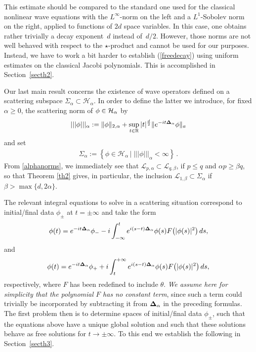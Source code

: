 This estimate should be compared to the standard one used for the
classical nonlinear wave equations with the $L^\infty$-norm on the
left and a $L^1$-Sobolev norm on the right, applied to
functions of $2d$ space variables. In this case, one obtains rather
trivially a decay exponent~$d$ instead of~$d/2$. However, those norms
are not well behaved with respect to the $\star$-product and cannot be
used for our purposes. Instead, we have to work a bit harder to establish
(\ref{freedecay}) using uniform estimates on the classical Jacobi
polynomials. This is accomplished in Section~\ref{secth2}.



Our last main result concerns the existence of wave operators
def\/ined on a scattering subspace $\Sigma_\alpha\subset \mathcal H_\alpha$. In order to def\/ine
the latter we introduce, for f\/ixed $\alpha\geq 0$, the scattering norm
of $\phi\in{\cal H}_\alpha$ by
\begin{gather*}%
|||\phi|||_{\alpha}:=
\Vert\phi\Vert_{2,\alpha}+\sup_{t\in\mathbb R} |t|^{\frac d2}
\Vert e^{-it{\bf\Delta}_\alpha}\phi\Vert_a
\end{gather*}
and set
\begin{gather*}
\Sigma_{\alpha}:=\left\{\phi\in\mathcal H_\alpha\,|\;|||\phi|||_{\alpha}<\infty\right\}\,.
\end{gather*}
From \eqref{alphanorms}, we immediately see that
$\mathcal L_{p,\alpha}\subset\mathcal L_{q,\beta}$, if $p\leq q$ and
$\alpha p\geq\beta q$, so that Theorem \ref{th2} gives, in particular, the
inclusion $\mathcal L_{1,\beta}\subset\Sigma_\alpha$ if $\beta> \max\{d, 2\alpha\}$.

The relevant integral equations to solve in a scattering situation
correspond to initial/f\/inal data $\phi_\pm$ at $t=\pm\infty$ and
take the form
\begin{gather}
\label{NLSch4-}
\phi(t)=e^{-it{{\bf\Delta}_\alpha}}\phi_--i\int_{-\infty}^t
e^{i{(s-t){\bf\Delta}_\alpha}}\phi(s) F\big(|\phi(s)|^2\big)\,ds ,
\end{gather}
and
\begin{gather}
\label{NLSch4+}
\phi(t)=e^{-it{{\bf\Delta}_\alpha}}\phi_++i\int^{+\infty}_t
e^{i{(s-t){\bf\Delta}_\alpha}}\phi(s) F\big(|\phi(s)|^2\big)\,ds ,
\end{gather}
respectively, where $F$ has been redef\/ined to include $\theta$.
 {\it We assume here for simplicity that the polynomial $F$
has no constant term}, since such a term could trivially be incorporated by
subtracting it from ${\bf\Delta}_\alpha$ in the preceding formulas.   The
f\/irst problem
then is to determine spaces of initial/f\/inal data $\phi_\pm$, such that the
equations above have a unique global solution and such that these
solutions behave as free solutions for $t\to \pm\infty$.
To this end we establish the following in Section~\ref{secth3}.

